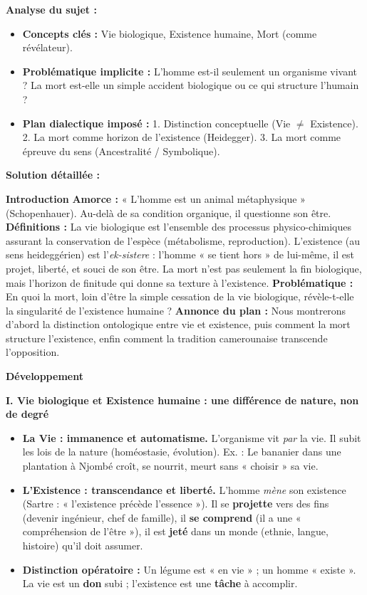 \documentclass[11pt]{article}
\newcommand{\cle}[1]{{\popxbold\color{popdark}#1}}
\begin{document}
\begin{exoresolu}
\textbf{Analyse du sujet :}
\begin{itemize}
    \item \textbf{Concepts clés :} Vie biologique, Existence humaine, Mort (comme révélateur).
    \item \textbf{Problématique implicite :} L'homme est-il seulement un organisme vivant ? La mort est-elle un simple accident biologique ou ce qui structure l'humain ?
    \item \textbf{Plan dialectique imposé :} 1. Distinction conceptuelle (Vie $\neq$ Existence). 2. La mort comme horizon de l'existence (Heidegger). 3. La mort comme épreuve du sens (Ancestralité / Symbolique).
\end{itemize}

\tcblower

\textbf{Solution détaillée :}

\textbf{Introduction}
\textbf{Amorce :} « L'homme est un animal métaphysique » (Schopenhauer). Au-delà de sa condition organique, il questionne son être.
\textbf{Définitions :} La \cle{vie biologique} est l'ensemble des processus physico-chimiques assurant la conservation de l'espèce (métabolisme, reproduction). L'\cle{existence} (au sens heideggérien) est l'\emph{ek-sistere} : l'homme « se tient hors » de lui-même, il est projet, liberté, et souci de son être. La \cle{mort} n'est pas seulement la fin biologique, mais l'horizon de finitude qui donne sa texture à l'existence.
\textbf{Problématique :} En quoi la mort, loin d'être la simple cessation de la vie biologique, révèle-t-elle la singularité de l'existence humaine ?
\textbf{Annonce du plan :} Nous montrerons d'abord la distinction ontologique entre vie et existence, puis comment la mort structure l'existence, enfin comment la tradition camerounaise transcende l'opposition.

\textbf{Développement}

\textbf{I. Vie biologique et Existence humaine : une différence de nature, non de degré}
\begin{itemize}
    \item \textbf{La Vie : immanence et automatisme.} L'organisme vit \emph{par} la vie. Il subit les lois de la nature (homéostasie, évolution). Ex. : Le bananier dans une plantation à Njombé croît, se nourrit, meurt sans « choisir » sa vie.
    \item \textbf{L'Existence : transcendance et liberté.} L'homme \emph{mène} son existence (Sartre : « l'existence précède l'essence »). Il se \textbf{projette} vers des fins (devenir ingénieur, chef de famille), il \textbf{se comprend} (il a une « compréhension de l'être »), il est \textbf{jeté} dans un monde (ethnie, langue, histoire) qu'il doit assumer.
    \item \textbf{Distinction opératoire :} Un légume est « en vie » ; un homme « existe ». La vie est un \textbf{don} subi ; l'existence est une \textbf{tâche} à accomplir.
\end{itemize}


\end{exoresolu}
\end{document}
